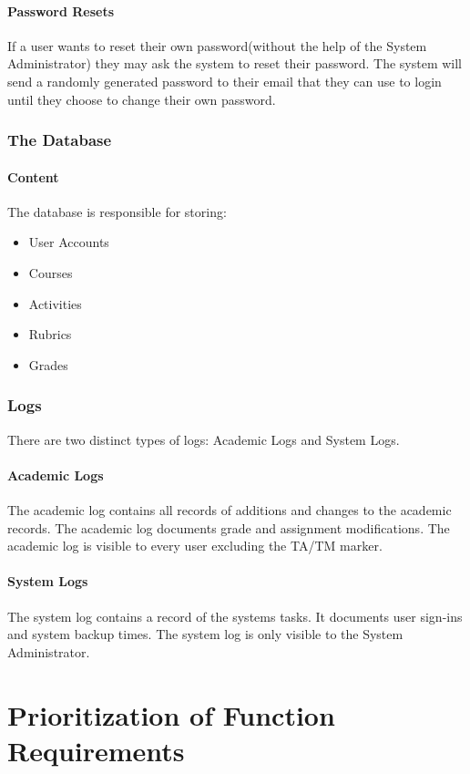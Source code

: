 \documentclass{article}
\begin{document}
\subsection{Password Resets \label{loginSystem2}}
If a user wants to reset their own password(without the help of the System
Administrator) they may ask the system to reset their password.  The system will
send a randomly generated password to their email that they can use to login
until they choose to change their own password.

\section{The Database}
\subsection{Content}
The database is responsible for storing:
\begin{itemize}
\item User Accounts
\item Courses
\item Activities
\item Rubrics
\item Grades
\end{itemize}

\section{Logs}
There are two distinct types of logs: Academic Logs and System Logs.
\subsection{Academic Logs}
The academic log contains all records of additions and changes to the academic records.
The academic log documents grade and assignment modifications.  The academic log
is visible to every user excluding the TA/TM marker.
\subsection{System Logs}
The system log contains a record of the systems tasks.  It documents user sign-ins
and system backup times. The system log is only visible to the System Administrator.

\part{Prioritization of Function Requirements}
\end{document}
